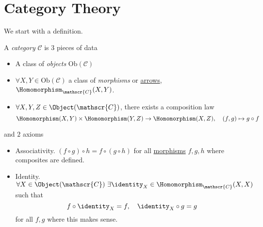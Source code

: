 \section{Category Theory}
We start with a definition.
\begin{definition}\label{def:category}\label{def:object}\label{def:morphism}
	A \emph{category} \(\mathscr{C} \) is \(3\) pieces of data
	\begin{itemize}
		\item A class of \emph{objects} \(\mathrm{Ob}(\mathscr{C})\)
		\item \(\forall X, Y\in\mathrm{Ob} (\mathscr{C})\) a class of \emph{morphisms} or \underline{arrows},
		      \(\Homomorphism_{\mathscr{C}}(X, Y)\).
		\item \(\forall X, Y, Z\in \Object (\mathscr{C})\), there exists a composition law
		      \[
			      \Homomorphism (X, Y)\times \Homomorphism (Y, Z)\to \Homomorphism (X, Z),\quad (f, g)\mapsto g\circ f
		      \]
	\end{itemize}
	and \(2\) axioms
	\begin{itemize}
		\item Associativity. \((f\circ g)\circ h = f\circ (g\circ h)\) for all \hyperref[def:morphism]{morphisms} \(f, g, h\)
		      where composites are defined.
		\item Identity. \(\forall X\in\Object (\mathscr{C})\ \exists \identity_{X}\in\Homomorphism _{\mathscr{C}} (X, X)\) such that
		      \[
			      f\circ \identity_{X} = f,\quad \identity_{X} \circ g = g
		      \]
		      for all \(f, g\) where this makes sense.
	\end{itemize}
\end{definition}

